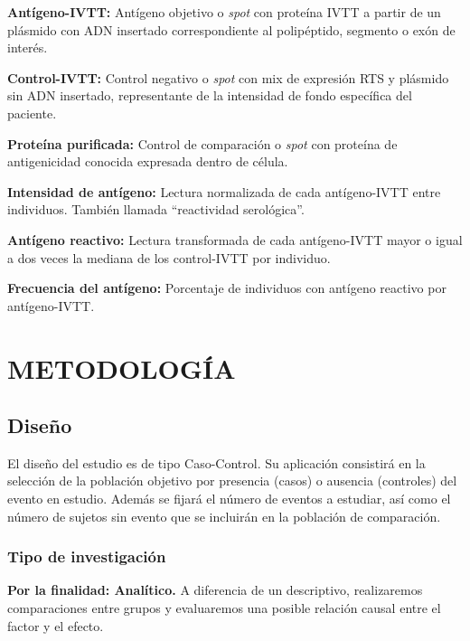 \documentclass[]{article}
\begin{document}
\begin{enumerate}
\begin{enumerate}
    \textbf{Antígeno-IVTT:} Antígeno objetivo o \emph{spot} con proteína
    IVTT a partir de un plásmido con ADN insertado correspondiente al
    polipéptido, segmento o exón de interés.

    \textbf{Control-IVTT:} Control negativo o \emph{spot} con mix de
    expresión RTS y plásmido sin ADN insertado, representante de la
    intensidad de fondo específica del paciente.

    \textbf{Proteína purificada:} Control de comparación o \emph{spot}
    con proteína de antigenicidad conocida expresada dentro de célula.

    \textbf{Intensidad de antígeno:} Lectura normalizada de cada
    antígeno-IVTT entre individuos. También llamada ``reactividad
    serológica''.

    \textbf{Antígeno reactivo:} Lectura transformada de cada
    antígeno-IVTT mayor o igual a dos veces la mediana de los
    control-IVTT por individuo.

    \textbf{Frecuencia del antígeno:} Porcentaje de individuos con
    antígeno reactivo por antígeno-IVTT.
  \end{enumerate}
\end{enumerate}

\hypertarget{meto}{\section{METODOLOGÍA}\label{meto}}

\subsection{Diseño}\label{diseno}

El diseño del estudio es de tipo Caso-Control. Su aplicación consistirá
en la selección de la población objetivo por presencia (casos) o
ausencia (controles) del evento en estudio. Además se fijará el número
de eventos a estudiar, así como el número de sujetos sin evento que se
incluirán en la población de comparación.

\subsubsection{Tipo de investigación}\label{tipo-de-investigacion}

\textbf{Por la finalidad: Analítico.} A diferencia de un descriptivo,
realizaremos comparaciones entre grupos y evaluaremos una posible
relación causal entre el factor y el efecto.
\end{document}
